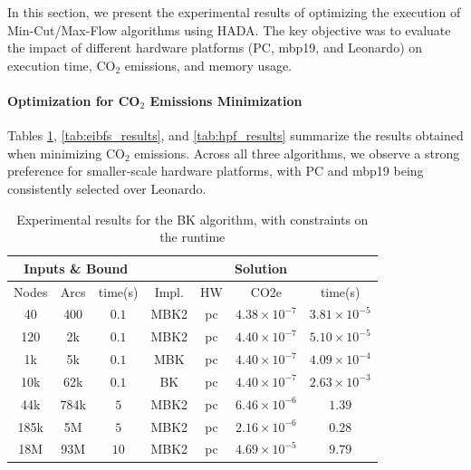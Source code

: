 \documentclass[a4paper,singleside,12pt]{report} %
\begin{document}
In this section, we present the experimental results of optimizing the execution of Min-Cut/Max-Flow algorithms using HADA. The key objective was to evaluate the impact of different
hardware platforms (PC, mbp19, and Leonardo) on execution time, CO$_2$ emissions, and memory usage.

\paragraph{Optimization for CO$_2$ Emissions Minimization}

Tables \ref{tab:bk_results}, \ref{tab:eibfs_results}, and \ref{tab:hpf_results} summarize the results obtained when minimizing CO$_2$ emissions. Across all three algorithms, we observe
a strong preference for smaller-scale hardware platforms, with PC and mbp19 being consistently selected over Leonardo.

\begin{table}[h!]
    \centering
    \begin{tabular}{|ccc|cccc|}
        \hline
        \multicolumn{3}{|c|}{Inputs \& Bound} & \multicolumn{4}{c|}{Solution} \\
        \hline
        Nodes & Arcs & time(s) & Impl. & HW & CO2e & time(s) \\
        \hline
        40 & 400 & $0.1$ & MBK2 & pc & $4.38 \times 10^{-7}$ & $3.81 \times 10^{-5}$ \\
        120 & 2k & $0.1$ & MBK2 & pc & $4.40 \times 10^{-7}$ & $5.10 \times 10^{-5}$ \\
        1k & 5k & $0.1$ & MBK & pc & $4.40 \times 10^{-7}$ & $4.09 \times 10^{-4}$ \\
        10k & 62k & $0.1$ & BK & pc & $4.40 \times 10^{-7}$ & $2.63 \times 10^{-3}$ \\
        44k & 784k & $5$ & MBK2 & pc & $6.46 \times 10^{-6}$ & $1.39$ \\
        185k & 5M & $5$ & MBK2 & pc & $2.16 \times 10^{-6}$ & $0.28$ \\
        18M & 93M & $10$ & MBK2 & pc & $4.69 \times 10^{-5}$& $9.79$ \\
        \hline
    \end{tabular}
    \caption{Experimental results for the BK algorithm, with constraints on the runtime}
    \label{tab:bk_results}
\end{table}
\end{document}
